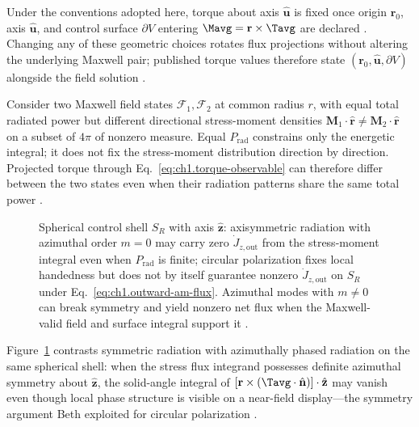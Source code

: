 Under the conventions adopted here, torque about axis $\hat{\mathbf{u}}$ is fixed once origin $\mathbf{r}_0$, axis $\hat{\mathbf{u}}$, and control surface $\partial V$ entering $\Mavg=\mathbf{r}\times\Tavg$ are declared \cite{stratton1941}. Changing any of these geometric choices rotates flux projections without altering the underlying Maxwell pair; published torque values therefore state $(\mathbf{r}_0,\hat{\mathbf{u}},\partial V)$ alongside the field solution \cite{beth1936}.

Consider two Maxwell field states \(\mathcal{F}_1,\mathcal{F}_2\) at common radius
\(r\), with equal total radiated power but different directional stress-moment
densities \(\mathbf{M}_1\cdot\hat{\mathbf{r}}\neq
\mathbf{M}_2\cdot\hat{\mathbf{r}}\) on a subset of $4\pi$ of nonzero measure. Equal $P_{\mathrm{rad}}$ constrains only the energetic integral; it does not fix the stress-moment distribution direction by direction. Projected torque through Eq.~\eqref{eq:ch1.torque-observable} can therefore differ between the two states even when their radiation patterns share the same total power \cite{stratton1941}.

\label{prop:ch1.torque-observable-criterion}
\begin{figure}[t]
\centering
\VolIPhysFig{\VolIPhysTorqueBalanceSurface}
\caption{Spherical control shell $S_R$ with axis $\hat{\mathbf{z}}$: axisymmetric radiation with azimuthal order $m=0$ may carry zero $\dot J_{z,\mathrm{out}}$ from the stress-moment integral even when $P_{\mathrm{rad}}$ is finite; circular polarization fixes local handedness but does not by itself guarantee nonzero $\dot J_{z,\mathrm{out}}$ on $S_R$ under Eq.~\eqref{eq:ch1.outward-am-flux}. Azimuthal modes with $m\neq 0$ can break symmetry and yield nonzero net flux when the Maxwell-valid field and surface integral support it \cite{beth1936,stratton1941}.}
\label{fig:ch1.wp-torque-balance-surface}
\end{figure}

Figure~\ref{fig:ch1.wp-torque-balance-surface} contrasts symmetric radiation with azimuthally phased
radiation on the same spherical shell: when the stress flux integrand possesses definite azimuthal
symmetry about $\hat{\mathbf{z}}$, the solid-angle integral of
$[\mathbf{r}\times(\Tavg\cdot\hat{\mathbf{n}})]\cdot\hat{\mathbf{z}}$ may vanish even though
local phase structure is visible on a near-field display---the symmetry argument Beth exploited for
circular polarization \cite{beth1936,stratton1941}.

